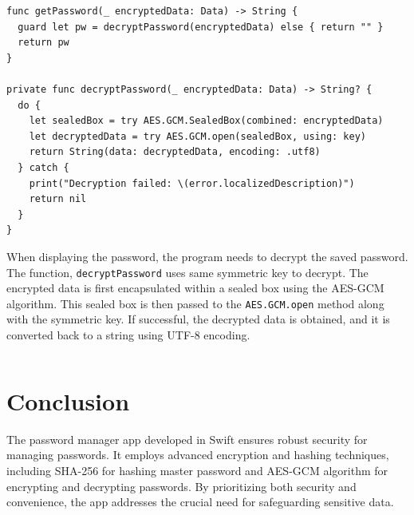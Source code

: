 \documentclass[10pt, titlepage]{article}
\begin{document}
\begin{center}
\begin{minipage}{\linewidth}
\begin{lstlisting}
func getPassword(_ encryptedData: Data) -> String {
  guard let pw = decryptPassword(encryptedData) else { return "" }
  return pw
}

private func decryptPassword(_ encryptedData: Data) -> String? {
  do {
    let sealedBox = try AES.GCM.SealedBox(combined: encryptedData)
    let decryptedData = try AES.GCM.open(sealedBox, using: key)
    return String(data: decryptedData, encoding: .utf8)
  } catch {
    print("Decryption failed: \(error.localizedDescription)")
    return nil
  }
}
\end{lstlisting}
\end{minipage}
\end{center}
When displaying the password, the program needs to decrypt the saved password. The function, \texttt{decryptPassword} uses same symmetric key to decrypt. The encrypted data is first encapsulated within a sealed box using the AES-GCM algorithm. This sealed box is then passed to the \texttt{AES.GCM.open} method along with the symmetric key. If successful, the decrypted data is obtained, and it is converted back to a string using UTF-8 encoding.

\begin{center}
\begin{minipage}{\linewidth}
\begin{lstlisting}
\end{lstlisting}
\end{minipage}
\end{center}

\section*{Conclusion}
The password manager app developed in Swift ensures robust security for managing passwords. It employs advanced encryption and hashing techniques, including SHA-256 for hashing master password and AES-GCM algorithm for encrypting and decrypting passwords. By prioritizing both security and convenience, the app addresses the crucial need for safeguarding sensitive data.

\newpage


\end{document}
